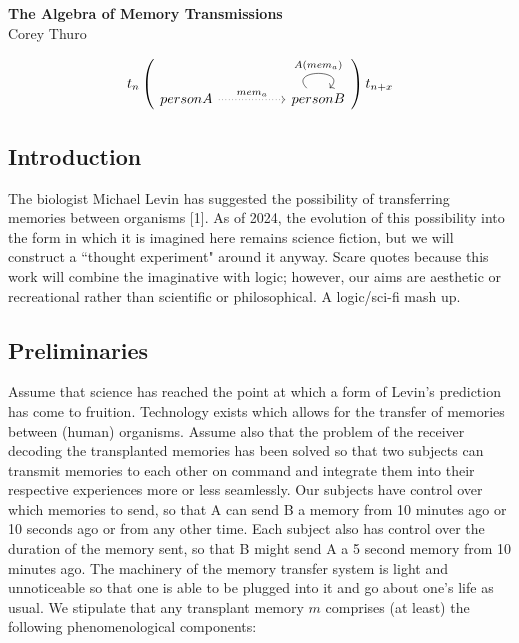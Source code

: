 \documentclass{article}
\begin{document}
\begin{center}
    {\Large\bfseries The Algebra of Memory Transmissions}\\ 
    \vspace{.5em}
    \normalsize Corey Thuro


\vspace{1em}

\[
t_n
\begin{pmatrix}
\begin{tikzcd}
    personA && 
    personB \arrow[loop, distance=2em, "{A(mem_a)}" , out=135, in=45] {}
    \arrow["{mem_a}", dotted, from=1-1, to=1-3]
\end{tikzcd}
\end{pmatrix}
t_{n+x}
\]
\end{center}

\subsection*{Introduction}
The biologist Michael Levin has suggested the possibility of transferring memories between organisms [1]. As of 2024, the evolution of this possibility into the form in which it is imagined here remains science fiction, but we will construct a ``thought experiment" around it anyway. Scare quotes because this work will combine the imaginative with logic; however, our aims are aesthetic or recreational rather than scientific or philosophical. A logic/sci-fi mash up.

\subsection*{Preliminaries}
Assume that science has reached the point at which a form of Levin's prediction has come to fruition. Technology exists which allows for the transfer of memories between (human) organisms. Assume also that the problem of the receiver decoding the transplanted memories has been solved so that two subjects can transmit memories to each other on command and integrate them into their respective experiences more or less seamlessly. Our subjects have control over which memories to send, so that A can send B a memory from 10 minutes ago or 10 seconds ago or from any other time. Each subject also has control over the duration of the memory sent, so that B might send A a 5 second memory from 10 minutes ago. The machinery of the memory transfer system is light and unnoticeable so that one is able to be plugged into it and go about one's life as usual. We stipulate that any transplant memory $m$ comprises (at least) the following phenomenological components:
\end{document}
